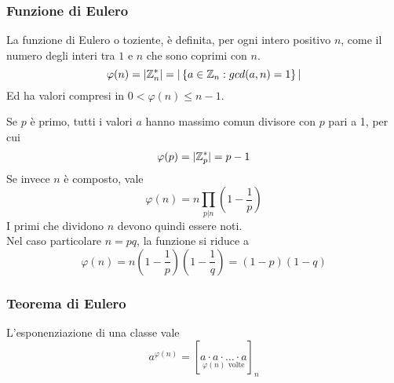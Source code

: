 \subsubsection{Funzione di Eulero}

\begin{definition}
    \label{def:euler_function}
    La funzione di Eulero o toziente, è definita, per ogni intero positivo $n$, come il numero degli interi tra $1$ e $n$ che sono coprimi con $n$. 
    \begin{equation*}
        \varphi (n)
        =
        | \mathbb{Z}_{n}^{*} |
        = |
        \left\{ 
            a \in \mathbb{Z}_{n} : gcd(a, n) = 1
        \right\}
        |
    \end{equation*}
    Ed ha valori compresi in $
    0 < \varphi (n) \leq n -1
    $.
\end{definition}
Se $p$ è primo, tutti i valori $a$ hanno massimo comun divisore con $p$ pari a 1, per cui
\begin{equation*}
    \varphi (p)
    =
    | \mathbb{Z}_{p}^{*} |
    = p - 1
\end{equation*}
Se invece $n$ è composto, vale
\begin{equation*}
    \varphi (n) 
    =
    n
    \prod_{p|n} 
    \left( 
        1 - \frac{1}{p}
    \right)
\end{equation*}
I primi che dividono $n$ devono quindi essere noti.
\\
Nel caso particolare $n=pq$, la funzione si riduce a
\begin{equation*}
    \varphi (n) 
    =
    n
    \left( 
        1 - \frac{1}{p}
    \right)
    \left( 
        1 - \frac{1}{q}
    \right)
    =
    \left( 1-p \right)
    \left( 1-q \right)
\end{equation*}


\subsubsection{Teorema di Eulero}


L'esponenziazione di una classe vale 
\begin{equation*}
    a^{\varphi (n)}
    =
    [
        \underset{
            \varphi (n) \text{ volte}
        }{
            a \cdot a \cdot \ldots \cdot a
        }
    ]_n
\end{equation*}

